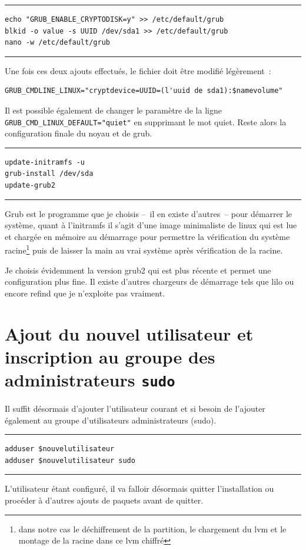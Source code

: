 \documentclass[12pt, a4paper]{report}
\begin{document}
\noindent \rule{\linewidth}{0.5pt}
\begin{verbatim}
echo "GRUB_ENABLE_CRYPTODISK=y" >> /etc/default/grub
blkid -o value -s UUID /dev/sda1 >> /etc/default/grub
nano -w /etc/default/grub
\end{verbatim}
\rule{\linewidth}{0.5pt}

Une fois ces deux ajouts effectués, le fichier doit être modifié légèrement~:
\begin{verbatim}
GRUB_CMDLINE_LINUX="cryptdevice=UUID=(l'uuid de sda1):$namevolume"
\end{verbatim}
Il est possible également de changer le paramètre de la ligne \newline 
\texttt{GRUB\_CMD\_LINUX\_DEFAULT="quiet"} en supprimant le mot quiet. 
Reste alors la configuration finale du noyau et de grub.

\noindent \rule{\linewidth}{0.5pt}
\begin{verbatim}
update-initramfs -u
grub-install /dev/sda
update-grub2
\end{verbatim}
\rule{\linewidth}{0.5pt}

Grub est le programme que je choisis --~il en existe d'autres~-- pour démarrer le système, quant à l'initramfs il s'agit d'une image minimaliste de linux qui est lue et chargée en mémoire au démarrage pour permettre la vérification du système racine\footnote{dans notre cas le déchiffrement de la partition, le chargement du lvm et le montage de la racine dans ce lvm chiffré} puis de laisser la main au vrai système après vérification de la racine.

Je choisis évidemment la version grub2 qui est plus récente et permet une configuration plus fine. 
Il existe d'autres chargeurs de démarrage tels que lilo ou encore refind que je n'exploite pas vraiment.

\section{Ajout du nouvel utilisateur et inscription au groupe des administrateurs \texttt{sudo}}
Il suffit désormais d'ajouter l'utilisateur courant et si besoin de l'ajouter également au groupe d'utilisateurs administrateurs (sudo).

\noindent \rule{\linewidth}{0.5pt}
\begin{verbatim}
adduser $nouvelutilisateur
adduser $nouvelutilisateur sudo
\end{verbatim}
\rule{\linewidth}{0.5pt}

L'utilisateur étant configuré, il va falloir désormais quitter l'installation ou procéder à d'autres ajouts de paquets avant de quitter.
\end{document}
